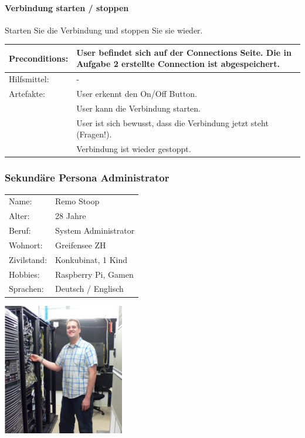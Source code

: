 \paragraph{Verbindung starten / stoppen}
Starten Sie die Verbindung und stoppen Sie sie wieder. \\


\begin{tabular}{ | p{} | p{} | }
\hline
Preconditions: & User befindet sich auf der Connections Seite. Die in Aufgabe 2 erstellte Connection ist abgespeichert. \\
\hline
Hilfsmittel: & - \\
\hline
Artefakte: & User erkennt den On/Off Button. \\
& User kann die Verbindung starten. \\
& User ist sich bewusst, dass die Verbindung jetzt steht (Fragen!). \\
& Verbindung ist wieder gestoppt. \\
\hline
\end{tabular}

\newpage
\subsubsection{Sekundäre Persona Administrator}

\noindent\begin{minipage}[t]{0.5\textwidth}
\vspace{0pt}
    \begin{tabular}{ l l }
        Name: & Remo Stoop \\
        Alter: & 28 Jahre \\
        Beruf: & System Administrator \\
        Wohnort: & Greifensee ZH \\
        Zivilstand: & Konkubinat, 1 Kind \\
        Hobbies: & Raspberry Pi, Gamen \\
        Sprachen: & Deutsch / Englisch \\
    \end{tabular}
\end{minipage}
\hfill
\begin{minipage}[t]{0.5\textwidth}
\vspace{0pt}
    \includegraphics[width=200px]{images/persona_administrator.jpg}\\
\end{minipage}


